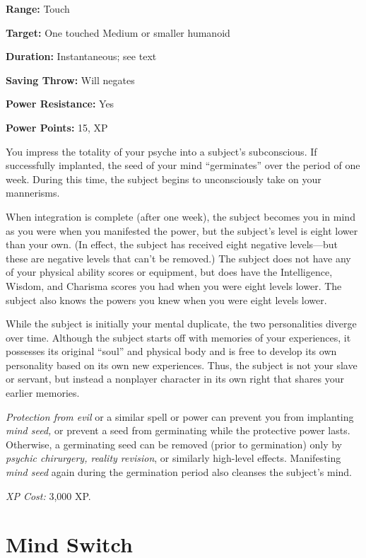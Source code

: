 \documentclass{article}
\begin{document}
\textbf{Range:} Touch

\textbf{Target:} One touched Medium or smaller humanoid

\textbf{Duration:} Instantaneous; see text

\textbf{Saving Throw:} Will negates

\textbf{Power Resistance:} Yes

\textbf{Power Points:} 15, XP

You impress the totality of your psyche into a subject's subconscious. If successfully 
implanted, the seed of your mind ``germinates'' over the period of one week. During 
this time, the subject begins to unconsciously take on your mannerisms. 

When integration is complete (after one week), the subject becomes you in mind 
as you were when you manifested the power, but the subject's level is eight lower 
than your own. (In effect, the subject has received eight negative levels---but 
these are negative levels that can't be removed.) The subject does not have any 
of your physical ability scores or equipment, but does have the Intelligence, Wisdom, 
and Charisma scores you had when you were eight levels lower. The subject also 
knows the powers you knew when you were eight levels lower.

While the subject is initially your mental duplicate, the two personalities diverge 
over time. Although the subject starts off with memories of your experiences, it 
possesses its original ``soul'' and physical body and is free to develop its own 
personality based on its own new experiences. Thus, the subject is not your slave 
or servant, but instead a nonplayer character in its own right that shares your 
earlier memories.

\textit{Protection from evil }or a similar spell or power can prevent you from 
implanting \textit{mind seed, }or prevent a seed from germinating while the protective 
power lasts. Otherwise, a germinating seed can be removed (prior to germination) 
only by \textit{psychic chirurgery, reality revision}, or similarly high-level 
effects. Manifesting \textit{mind seed }again during the germination period also 
cleanses the subject's mind.

\textit{XP Cost: }3,000 XP.

\vspace{12pt}
\section*{Mind Switch}
\end{document}
